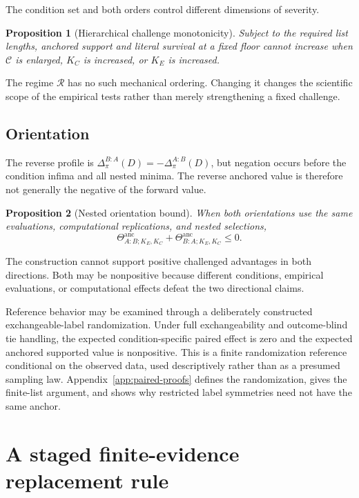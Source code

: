 \documentclass[11pt]{article}
\newcommand{\Regime}{\mathcal{R}}
\newcommand{\CSet}{\mathcal{C}}
\newcommand{\Thetaanc}{\Theta^{\mathrm{anc}}}
\newtheorem{proposition}{Proposition}
\theoremstyle{remark}
\begin{document}
The condition set and both orders control different dimensions of severity.

\begin{proposition}[Hierarchical challenge monotonicity]
\label{prop:monotonicity}
Subject to the required list lengths, anchored support and literal survival at
a fixed floor cannot increase when $\CSet$ is enlarged, $K_C$ is increased, or
$K_E$ is increased.
\end{proposition}

The regime $\Regime$ has no such mechanical ordering. Changing it changes the
scientific scope of the empirical tests rather than merely strengthening a
fixed challenge.

\subsection{Orientation}

The reverse profile is
$\Delta^{B:A}_\pi(D)=-\Delta^{A:B}_\pi(D)$, but negation occurs before the
condition infima and all nested minima. The reverse anchored value is therefore
not generally the negative of the forward value.

\begin{proposition}[Nested orientation bound]
\label{prop:orientation}
When both orientations use the same evaluations, computational replications,
and nested selections,
\begin{equation}
\Thetaanc_{A:B;K_E,K_C}
+
\Thetaanc_{B:A;K_E,K_C}
\leq0.
\label{eq:orientation}
\end{equation}
\end{proposition}
The construction cannot support positive challenged advantages in both
directions. Both may be nonpositive because different conditions, empirical
evaluations, or computational effects defeat the two directional claims.

Reference behavior may be examined through a deliberately constructed
exchangeable-label randomization. Under full exchangeability and outcome-blind
tie handling, the expected condition-specific paired effect is zero and the
expected anchored supported value is nonpositive. This is a finite
randomization reference conditional on the observed data, used descriptively
rather than as a presumed sampling law. Appendix~\ref{app:paired-proofs}
defines the randomization, gives the finite-list argument, and shows why
restricted label symmetries need not have the same anchor.

\section{A staged finite-evidence replacement rule}
\label{sec:decision}
\end{document}
